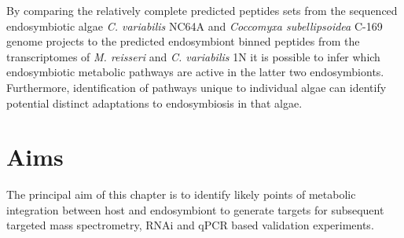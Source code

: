 By comparing the relatively complete predicted peptides sets from 
the sequenced endosymbiotic algae \textit{C. variabilis} NC64A and \textit{Coccomyxa
subellipsoidea} C-169 genome projects to the predicted endosymbiont binned peptides
from the transcriptomes of \textit{M. reisseri} and \textit{C. variabilis} 1N
it is possible to infer which endosymbiotic metabolic pathways 
are active in the latter two endosymbionts.  Furthermore, identification
of pathways unique to individual algae can identify potential distinct
adaptations to endosymbiosis in that algae.

%
%
%
%
%
%
%
%
%


\section{Aims}

The principal aim of this chapter is to identify
likely points of metabolic integration between host and 
endosymbiont to generate targets for subsequent 
targeted mass spectrometry, RNAi and qPCR based validation
experiments. 

